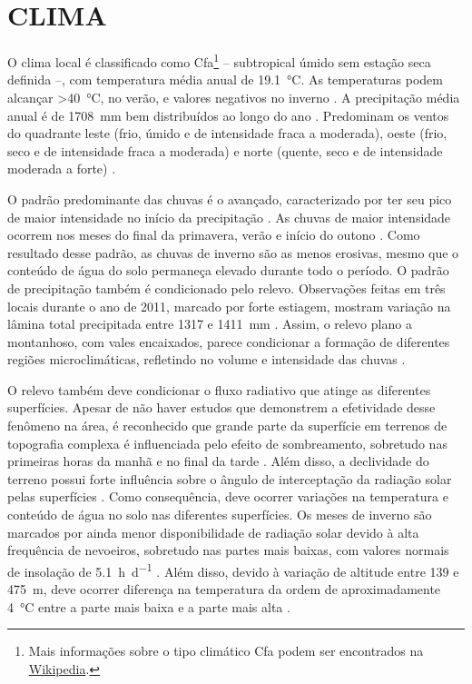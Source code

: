 \section{CLIMA}
\label{sec:chap03-clima}

\def\footcfa{\footnote{Mais informações sobre o tipo climático Cfa podem ser encontrados na 
\href{https://pt.wikipedia.org/wiki/Clima_subtropical_\%C3\%BAmido}{Wikipedia}.}}

O clima local é classificado como Cfa\footcfa{} -- subtropical úmido sem estação seca definida --, com 
temperatura média anual de \SI{19,1}{\celsius}. As temperaturas podem alcançar \SI{>40}{\celsius}, no verão, e 
valores negativos no inverno \cite{HeldweinEtAl2009}. A precipitação média anual é de \SI{1708}{\milli\metre} 
bem distribuídos ao longo do ano \cite{Maluf2000}. Predominam os ventos do quadrante leste (frio, úmido e de 
intensidade fraca a moderada), oeste (frio, seco e de intensidade fraca a moderada) e norte (quente, seco e de 
intensidade moderada a forte) \cite{HeldweinEtAl2009}.

O padrão predominante das chuvas é o avançado, caracterizado por ter seu pico de maior intensidade no início 
da 
precipitação \cite{MehlEtAl2001}. As chuvas de maior intensidade ocorrem nos meses do final da primavera, 
verão e início do outono \cite{MouraBueno2012}. Como resultado desse padrão, as chuvas de inverno são as 
menos erosivas, mesmo que o conteúdo de água do solo permaneça elevado durante todo o período. O padrão de 
precipitação também é condicionado pelo relevo. Observações feitas em três locais durante o ano de \num{2011}, 
marcado por forte estiagem, mostram variação na lâmina total precipitada entre \num{1317} e \SI{1411}{\mm} 
\cite{MouraBueno2012}. Assim, o relevo plano a montanhoso, com vales encaixados, parece condicionar a formação 
de diferentes regiões microclimáticas, refletindo no volume e intensidade das chuvas \cite{MouraBueno2012}.

O relevo também deve condicionar o fluxo radiativo que atinge as diferentes superfícies. Apesar de não haver 
estudos que demonstrem a efetividade desse fenômeno na área, é reconhecido que grande parte da superfície em 
terrenos de topografia complexa é influenciada pelo efeito de sombreamento, sobretudo nas primeiras horas da 
manhã e no final da tarde \cite{OliphantEtAl2003}. Além disso, a declividade do terreno possui forte 
influência 
sobre o ângulo de interceptação da radiação solar pelas superfícies \cite{Birkeland1999}. Como consequência, 
deve ocorrer variações na temperatura e conteúdo de água no solo nas diferentes superfícies. Os meses de 
inverno são marcados por ainda menor disponibilidade de radiação solar devido à alta frequência de nevoeiros, 
sobretudo nas partes mais baixas, com valores normais de insolação de \SI{5,1}{\hour\per\day} 
\cite{HeldweinEtAl2009}. Além disso, devido à variação de altitude entre \num{139} e \SI{475}{\metre}, deve 
ocorrer diferença na temperatura da ordem de aproximadamente \SI{4}{\celsius} entre a parte mais baixa e a 
parte mais alta \cite{HeldweinEtAl2009}.

